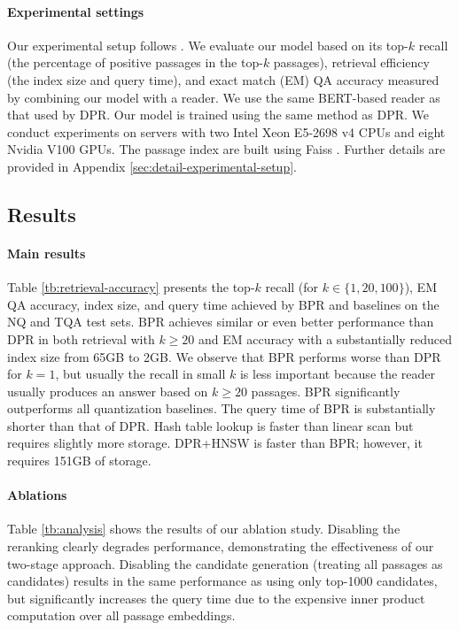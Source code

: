 \documentclass[11pt,a4paper]{article}
\begin{document}
\paragraph{Experimental settings}
Our experimental setup follows \citet{Karpukhin2020DenseAnswering}.
We evaluate our model based on its top-$k$ recall (the percentage of positive passages in the top-$k$ passages), retrieval efficiency (the index size and query time), and exact match (EM) QA accuracy measured by combining our model with a reader.
We use the same BERT-based reader as that used by DPR.
Our model is trained using the same method as DPR.
We conduct experiments on servers with two Intel Xeon E5-2698 v4 CPUs and eight Nvidia V100 GPUs.
The passage index are built using Faiss \cite{Johnson2019Billion-scaleGPUs}.
Further details are provided in Appendix \ref{sec:detail-experimental-setup}.

\subsection{Results}
\paragraph{Main results}
Table \ref{tb:retrieval-accuracy} presents the top-$k$ recall (for $k \in \{1, 20, 100\}$), EM QA accuracy, index size, and query time achieved by BPR and baselines on the NQ and TQA test sets.
BPR achieves similar or even better performance than DPR in both retrieval with $k\geq20$ and EM accuracy with a substantially reduced index size from 65GB to 2GB.
We observe that BPR performs worse than DPR for $k=1$, but usually the recall in small $k$ is less important because the reader usually produces an answer based on $k \geq 20$ passages.
BPR significantly outperforms all quantization baselines.
The query time of BPR is substantially shorter than that of DPR.
Hash table lookup is faster than linear scan but requires slightly more storage.
DPR+HNSW is faster than BPR; however, it requires 151GB of storage.

\paragraph{Ablations}
Table \ref{tb:analysis} shows the results of our ablation study.
Disabling the reranking clearly degrades performance, demonstrating the effectiveness of our two-stage approach.
Disabling the candidate generation (treating all passages as candidates) results in the same performance as using only top-1000 candidates, but significantly increases the query time due to the expensive inner product computation over all passage embeddings.
\end{document}
